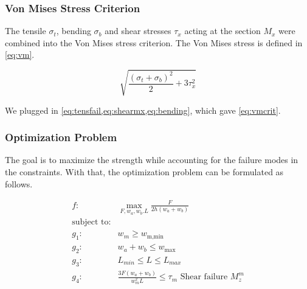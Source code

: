 \subsubsection{Von Mises Stress Criterion}
The tensile $\sigma_t$, bending $\sigma_b$ and shear stresses $\tau_x$ acting at the section $M_x$ were combined into the Von Mises stress criterion. 
The Von Mises stress is defined in \cref{eq:vm}.

\begin{equation}
	\label{eq:vm}
	\sqrt{\frac{\left( \sigma_t + \sigma_b \right)^2}{2} + 3\tau_x ^2}
\end{equation}

We plugged in \cref{eq:tensfail,eq:shearmx,eq:bending}, which gave \cref{eq:vmcrit}.

\begin{table}[H]
\end{table}


\subsubsection{Optimization Problem}
The goal is to maximize the strength while accounting for the failure modes in the constraints.
With that, the optimization problem can be formulated as follows. 

\begin{align*}
	f: & \max_{F, {w_a}, {w_b}. L} \frac{F}{2h \left(w_a + w_b\right)} \nonumber \\
	\text{subject to:} & \nonumber \\
	g_1: & w_m \ge w_\text{m,min} \\
	g_2: & w_a + w_b \le w_\text{max} \\
	g_3: & L_{min} \le L \le L_{max} \\
	g_4: & \frac{ 3 F \left(w_a + w_b \right) }{ w_m ^2 L} \le \tau_m						\text{ Shear failure } M_z^m 
\end{align*}	
\vspace{-8mm}

